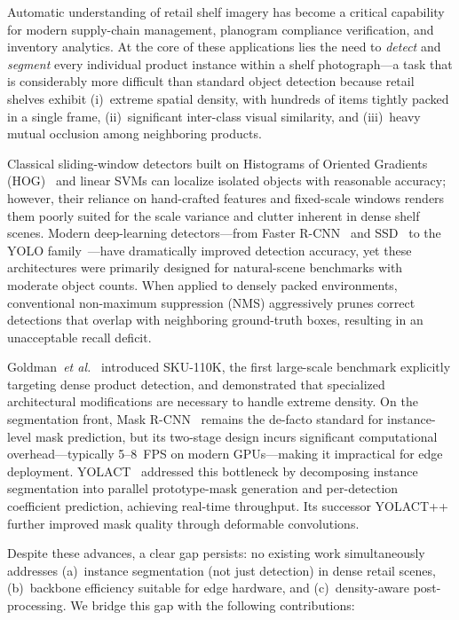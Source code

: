 \documentclass[conference]{IEEEtran}
\newcommand{\etal}{\emph{et al.}}
\begin{document}
Automatic understanding of retail shelf imagery has become a critical
capability for modern supply-chain management, planogram compliance
verification, and inventory analytics. At the core of these applications
lies the need to \emph{detect} and \emph{segment} every individual product
instance within a shelf photograph---a task that is considerably more
difficult than standard object detection because retail shelves exhibit
(i)~extreme spatial density, with hundreds of items tightly packed in a
single frame, (ii)~significant inter-class visual similarity, and
(iii)~heavy mutual occlusion among neighboring products.

Classical sliding-window detectors built on Histograms of Oriented
Gradients (HOG)~\cite{dalal2005hog} and linear SVMs can localize isolated
objects with reasonable accuracy; however, their reliance on hand-crafted
features and fixed-scale windows renders them poorly suited for the
scale variance and clutter inherent in dense shelf scenes. Modern
deep-learning detectors---from Faster R-CNN~\cite{ren2015faster} and
SSD~\cite{liu2016ssd} to the YOLO family~\cite{redmon2016yolo}---have
dramatically improved detection accuracy, yet these architectures were
primarily designed for natural-scene benchmarks with moderate object
counts. When applied to densely packed environments, conventional
non-maximum suppression (NMS) aggressively prunes correct detections that
overlap with neighboring ground-truth boxes, resulting in an unacceptable
recall deficit.

Goldman~\etal~\cite{goldman2019dense} introduced SKU-110K, the first
large-scale benchmark explicitly targeting dense product detection, and
demonstrated that specialized architectural modifications are necessary to
handle extreme density. On the segmentation front, Mask
R-CNN~\cite{he2017mask} remains the de-facto standard for instance-level
mask prediction, but its two-stage design incurs significant computational
overhead---typically 5--8~FPS on modern GPUs---making it impractical for
edge deployment. YOLACT~\cite{bolya2019yolact} addressed this bottleneck
by decomposing instance segmentation into parallel prototype-mask
generation and per-detection coefficient prediction, achieving real-time
throughput. Its successor YOLACT++~\cite{bolya2020yolact} further improved
mask quality through deformable convolutions.

Despite these advances, a clear gap persists: no existing work
simultaneously addresses (a)~instance segmentation (not just detection) in
dense retail scenes, (b)~backbone efficiency suitable for edge hardware,
and (c)~density-aware post-processing. We bridge this gap with the
following contributions:
\end{document}
